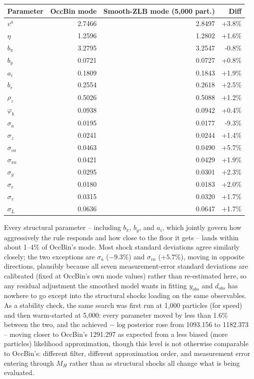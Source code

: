 \documentclass[11pt]{article}
\begin{document}
\begin{center}
\begin{tabular}{@{}lrrr@{}}
\toprule
Parameter & OccBin mode & Smooth-ZLB mode (5{,}000 part.) & Diff \\
\midrule
$v^a$           & 2.7466 & 2.8497 & +3.8\% \\
$\eta$          & 1.2596 & 1.2802 & +1.6\% \\
$b_\pi$         & 3.2795 & 3.2547 & -0.8\% \\
$b_y$           & 0.0721 & 0.0727 & +0.8\% \\
$a_i$           & 0.1809 & 0.1843 & +1.9\% \\
$b_r$           & 0.2554 & 0.2618 & +2.5\% \\
$\rho_z$        & 0.5026 & 0.5088 & +1.2\% \\
$\varphi_b$     & 0.0938 & 0.0942 & +0.4\% \\
\midrule
$\sigma_a$      & 0.0195 & 0.0177 & -9.3\% \\
$\sigma_z$      & 0.0241 & 0.0244 & +1.4\% \\
$\sigma_{va}$   & 0.0463 & 0.0490 & +5.7\% \\
$\sigma_{xa}$   & 0.0421 & 0.0429 & +1.9\% \\
$\sigma_g$      & 0.0295 & 0.0301 & +2.3\% \\
$\sigma_r$      & 0.0180 & 0.0183 & +2.0\% \\
$\sigma_\tau$   & 0.0315 & 0.0320 & +1.7\% \\
$\sigma_L$      & 0.0636 & 0.0647 & +1.7\% \\
\bottomrule
\end{tabular}
\end{center}

Every structural parameter -- including $b_\pi$, $b_y$, and $a_i$, which
jointly govern how aggressively the rule responds and how close to the
floor it gets -- lands within about 1--4\% of OccBin's mode. Most shock
standard deviations agree similarly closely; the two exceptions are
$\sigma_a$ ($-9.3\%$) and $\sigma_{va}$ ($+5.7\%$), moving in opposite
directions, plausibly because all seven measurement-error standard
deviations are calibrated (fixed at OccBin's own mode values) rather than
re-estimated here, so any residual adjustment the smoothed model wants in
fitting $y_{obs}$ and $d_{obs}$ has nowhere to go except into the
structural shocks loading on the same observables. As a stability check,
the same search was first run at 1{,}000 particles (for speed) and then
warm-started at 5{,}000: every parameter moved by less than 1.6\% between
the two, and the achieved $-\log\text{posterior}$ rose from 1093.156 to
1182.373 -- moving closer to OccBin's 1291.297 as expected from a less
biased (more particles) likelihood approximation, though this level is
not otherwise comparable to OccBin's: different filter, different
approximation order, and measurement error entering through $M_H$ rather
than as structural shocks all change what is being evaluated.
\end{document}
